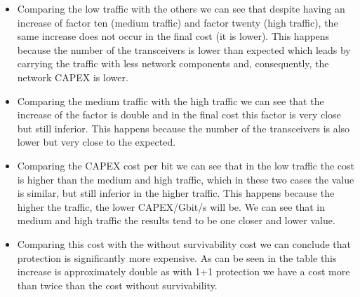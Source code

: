 \begin{itemize}
    \item Comparing the low traffic with the others we can see that despite having an increase of factor ten (medium traffic) and factor twenty (high traffic), the same increase does not occur in the final cost (it is lower). This happens because the number of the transceivers is lower than expected which leads by carrying the traffic with less network components and, consequently, the network CAPEX is lower.
  \item Comparing the medium traffic with the high traffic we can see that the increase of the factor is double and in the final cost this factor is very close but still inferior. This happens because the number of the transceivers is also lower but very close to the expected.
  \item Comparing the CAPEX cost per bit we can see that in the low traffic the cost is higher than the medium and high traffic, which in these two cases the value is similar, but still inferior in the higher traffic. This happens because the higher the traffic, the lower CAPEX/Gbit/s will be. We can see that in medium and high traffic the results tend to be one closer and lower value.
  \item Comparing this cost with the without survivability cost we can conclude that protection is significantly more expensive. As can be seen in the table this increase is approximately double as with 1+1 protection we have a cost more than twice than the cost without survivability.
\end{itemize}
